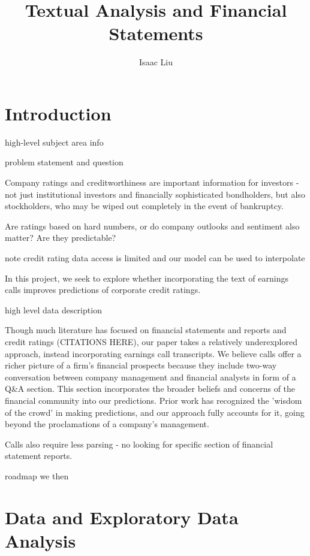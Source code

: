 \documentclass{article}
\title{Textual Analysis and Financial Statements}
\author{Isaac Liu}
\begin{document}
	\maketitle

    \section*{Introduction}

    high-level subject area info

    \citep{das_credit_2023}

    problem statement and question

    Company ratings and creditworthiness are important information for investors - not just institutional investors and financially sophisticated bondholders, but also stockholders, who may be wiped out completely in the event of bankruptcy.

    Are ratings based on hard numbers, or do company outlooks and sentiment also matter? Are they predictable?

    note credit rating data access is limited and our model can be used to interpolate

    In this project, we seek to explore whether incorporating the text of earnings calls improves predictions of corporate credit ratings.

    high level data description

    Though much literature has focused on financial statements and reports and credit ratings (CITATIONS HERE), our paper takes a relatively underexplored approach, instead incorporating earnings call transcripts. We believe calls offer a richer picture of a firm's financial prospects because they include two-way conversation between company management and financial analysts in form of a Q&A section. This section incorporates the broader beliefs and concerns of the financial community into our predictions. Prior work has recognized the 'wisdom of the crowd' in making predictions, and our approach fully accounts for it, going beyond the proclamations of a company's management.

    Calls also require less parsing - no looking for specific section of financial statement reports.

    roadmap
    we then

    \section*{Data and Exploratory Data Analysis}
\end{document}
